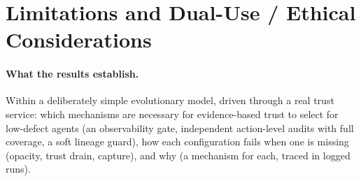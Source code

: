\documentclass[11pt]{article}
\begin{document}
\label{end:main}%




\appendix

\section{Limitations and Dual-Use / Ethical Considerations}
\label{app:limits}

\paragraph{What the results establish.} Within a deliberately simple evolutionary model,
driven through a real trust service: which mechanisms are necessary for evidence-based trust
to select for low-defect agents (an observability gate, independent action-level audits with
full coverage, a soft lineage guard), how each configuration fails when one is missing
(opacity, trust drain, capture), and why (a mechanism for each, traced in logged runs).
\end{document}
